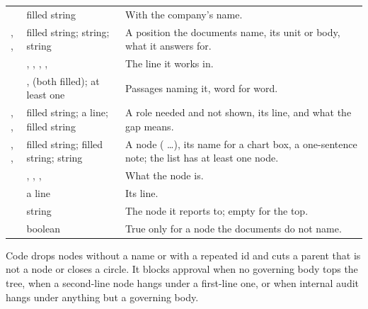 \par\nopagebreak
\begin{xltabular}{\textwidth}{@{}L{40mm}L{34mm}Y@{}}
\toprule
{} &  &  \\
\midrule
\endhead
\bottomrule
\endlastfoot
{} & filled string & With the company's name. \\
, ,  & filled string; string; string & A position the documents name, its unit or body, what it answers for. \\
 & , , , ,  & The line it works in. \\
 & ,  (both filled); at least one & Passages naming it, word for word. \\
, ,  & filled string; a line; filled string & A role needed and not shown, its line, and what the gap means. \\
, ,  & filled string; filled string; string & A node ( …), its name for a chart box, a one-sentence note; the list has at least one node. \\
 & , , ,  & What the node is. \\
 & a line & Its line. \\
 & string & The node it reports to; empty for the top. \\
 & boolean & True only for a node the documents do not name. \\
\end{xltabular}

Code drops nodes without a name or with a repeated id and cuts a parent that is not a node or
closes a circle. It blocks approval when no governing body tops the tree, when a second-line
node hangs under a first-line one, or when internal audit hangs under anything but a governing
body.

